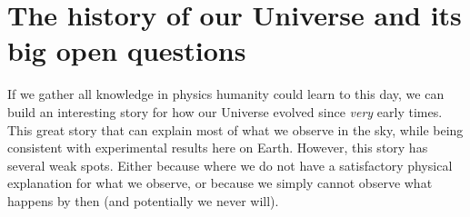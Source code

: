 \chaptertoc{}

\vspace{1em}



\section{The history of our Universe and its big open questions}

    If we gather all knowledge in physics humanity could learn to this day, 
    we can build an interesting story for how our Universe evolved since 
    \emph{very} early times. This great story that can explain most of what 
    we observe in the sky, while being consistent with experimental results here on Earth.  
    However, this story has several weak spots. Either because where we do not have 
    a satisfactory physical explanation for what we observe, or 
    because we simply cannot observe what happens by then (and potentially we never will).

